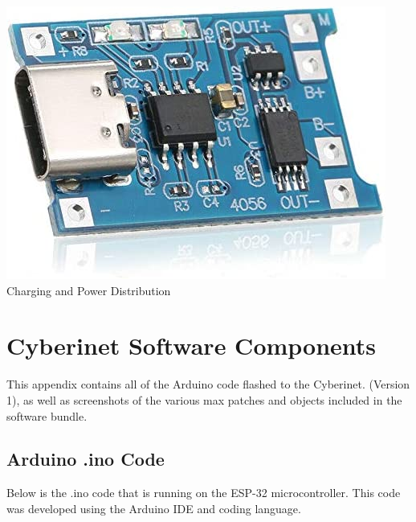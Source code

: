 \begin{center}
    \includegraphics[scale=0.25]{diagrams/oem/4056.jpg}\\
    \caption{Charging and Power Distribution}
\end{center}



\chapter{Cyberinet Software Components}
This appendix contains all of the Arduino code flashed to the Cyberinet. (Version 1), as well as screenshots of the various max patches and objects included in the software bundle.

\section{Arduino .ino Code}

Below is the .ino code that is running on the ESP-32 microcontroller. This code was developed using the Arduino IDE and coding language.

